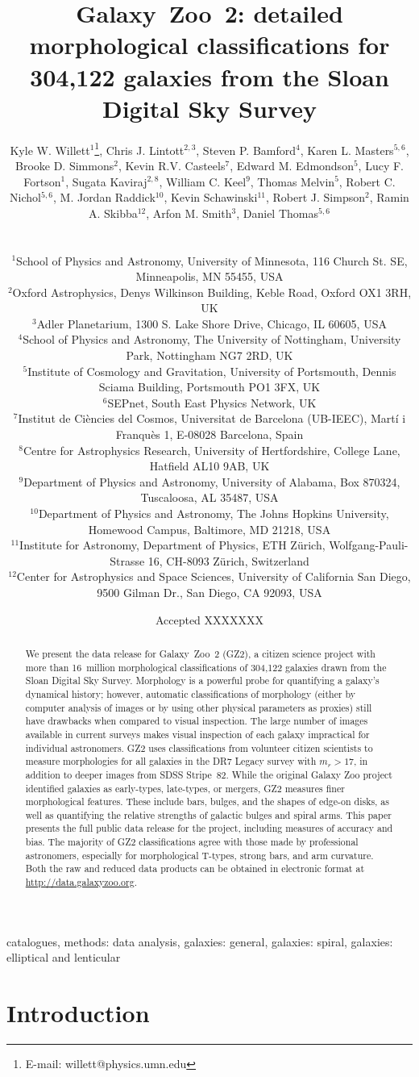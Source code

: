 \documentclass[useAMS,usenatbib]{mn2e}
\title[Galaxy Zoo 2 data release]{Galaxy~Zoo~2: detailed morphological classifications for 304,122 galaxies from the Sloan Digital Sky Survey}
\author[Willett et al.]{
  \parbox[t]{16cm}{
  Kyle W. Willett$^{1}$\thanks{E-mail: willett@physics.umn.edu},
  Chris J. Lintott$^{2,3}$,
  Steven P. Bamford$^{4}$,
  Karen L. Masters$^{5,6}$,
  Brooke D. Simmons$^{2}$,
  Kevin R.V. Casteels$^{7}$,
  Edward M. Edmondson$^{5}$,
  Lucy F. Fortson$^{1}$,
  Sugata Kaviraj$^{2,8}$,
  William C. Keel$^{9}$,
  Thomas Melvin$^{5}$,
  Robert C. Nichol$^{5,6}$,
  M. Jordan Raddick$^{10}$,
  Kevin Schawinski$^{11}$,
  Robert J. Simpson$^{2}$,
  Ramin A. Skibba$^{12}$,
  Arfon M. Smith$^{3}$,
  Daniel Thomas$^{5,6}$
  \\
  }\\
$^{1}$School of Physics and Astronomy, University of Minnesota, 116 Church St. SE, Minneapolis, MN 55455, USA \\
$^{2}$Oxford Astrophysics, Denys Wilkinson Building, Keble Road, Oxford OX1 3RH, UK \\
$^{3}$Adler Planetarium, 1300 S. Lake Shore Drive, Chicago, IL 60605, USA \\
$^{4}$School of Physics and Astronomy, The University of Nottingham, University Park, Nottingham NG7 2RD, UK \\
$^{5}$Institute of Cosmology and Gravitation, University of Portsmouth, Dennis Sciama Building, Portsmouth PO1 3FX, UK \\
$^{6}$SEPnet, South East Physics Network, UK \\
$^{7}$Institut de Ci\`encies del Cosmos, Universitat de Barcelona (UB-IEEC), Mart\'i i Franqu\`es 1, E-08028 Barcelona, Spain \\
$^{8}$Centre for Astrophysics Research, University of Hertfordshire, College Lane, Hatfield AL10 9AB, UK \\
$^{9}$Department of Physics and Astronomy, University of Alabama, Box 870324, Tuscaloosa, AL 35487, USA \\
$^{10}$Department of Physics and Astronomy, The Johns Hopkins University, Homewood Campus, Baltimore, MD 21218, USA \\
$^{11}$Institute for Astronomy, Department of Physics, ETH Z\"urich, Wolfgang-Pauli-Strasse 16, CH-8093 Z\"urich, Switzerland \\
$^{12}$Center for Astrophysics and Space Sciences, University of California San Diego, 9500 Gilman Dr., San Diego, CA 92093, USA \\
}
\begin{document}
\date{Accepted XXXXXXX}

\pagerange{\pageref{firstpage}--\pageref{lastpage}} 

\maketitle

\label{firstpage}

\begin{abstract}
We present the data release for Galaxy~Zoo~2 (GZ2), a citizen science project with more than 16~million morphological classifications of 304,122 galaxies drawn from the Sloan Digital Sky Survey. Morphology is a powerful probe for quantifying a galaxy's dynamical history; however, automatic classifications of morphology (either by computer analysis of images or by using other physical parameters as proxies) still have drawbacks when compared to visual inspection. The large number of images available in current surveys makes visual inspection of each galaxy impractical for individual astronomers. GZ2 uses classifications from volunteer citizen scientists to measure morphologies for all galaxies in the DR7 Legacy survey with $m_r>17$, in addition to deeper images from SDSS Stripe~82. While the original Galaxy Zoo project identified galaxies as early-types, late-types, or mergers, GZ2 measures finer morphological features. These include bars, bulges, and the shapes of edge-on disks, as well as quantifying the relative strengths of galactic bulges and spiral arms. This paper presents the full public data release for the project, including measures of accuracy and bias. The majority of GZ2 classifications agree with those made by professional astronomers, especially for morphological T-types, strong bars, and arm curvature. Both the raw and reduced data products can be obtained in electronic format at \url{http://data.galaxyzoo.org}.
\end{abstract}

\begin{keywords}
catalogues, methods: data analysis, galaxies: general, galaxies: spiral, galaxies: elliptical and lenticular
\end{keywords}


\section{Introduction} \label{sec-intro}
\end{document}
